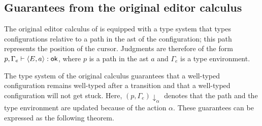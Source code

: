 \documentclass[sigplan,review]{acmart}
\begin{document}

\subsection{Guarantees from the original editor calculus}

The original editor calculus of \cite{type_safe_structure_editor} is
equipped with a type system that types configurations relative to a
path in the ast of the configuration; this path represents the
position of the cursor. Judgments are therefore of the form
$p, \Gamma_e \vdash \langle E,a \rangle : \textsf{ok}$, where $p$ is a path in
the ast $a$ and $\Gamma_e$ is a type environment.

The type system of the original calculus guarantees that a well-typed
configuration remains well-typed after a transition and that a
well-typed configuration will not get stuck. Here,
$(p,\Gamma_e)\downarrow_\alpha$ denotes that the path and the type
environment are updated because of the action $\alpha$. These
guarantees can be expressed as the following theorem.
\end{document}
